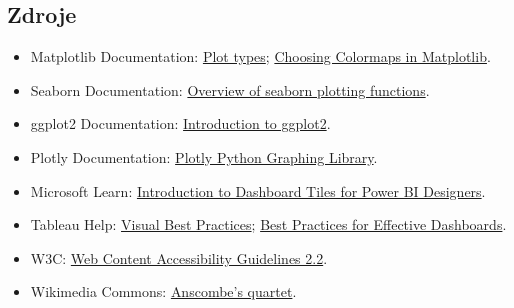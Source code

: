 \subsection{Zdroje}
\begin{itemize}
  \item Matplotlib Documentation: \href{https://matplotlib.org/stable/plot_types/index.html}{Plot types};
  \href{https://matplotlib.org/stable/users/explain/colors/colormaps.html}{Choosing Colormaps in Matplotlib}.
  \item Seaborn Documentation: \href{https://seaborn.pydata.org/tutorial/function_overview.html}{Overview of seaborn plotting functions}.
  \item ggplot2 Documentation: \href{https://ggplot2.tidyverse.org/articles/ggplot2.html}{Introduction to ggplot2}.
  \item Plotly Documentation: \href{https://plotly.com/python/}{Plotly Python Graphing Library}.
  \item Microsoft Learn: \href{https://learn.microsoft.com/en-ie/power-bi/create-reports/service-dashboard-tiles}{Introduction to Dashboard Tiles for Power BI Designers}.
  \item Tableau Help: \href{https://help.tableau.com/current/pro/desktop/en-us/visual_best_practices.htm}{Visual Best Practices};
  \href{https://help.tableau.com/current/pro/desktop/en-us/dashboards_best_practices.htm}{Best Practices for Effective Dashboards}.
  \item W3C: \href{https://www.w3.org/TR/WCAG22/}{Web Content Accessibility Guidelines 2.2}.
  \item Wikimedia Commons: \href{https://commons.wikimedia.org/wiki/Category:Anscombe's_quartet}{Anscombe's quartet}.
\end{itemize}

\newpage
